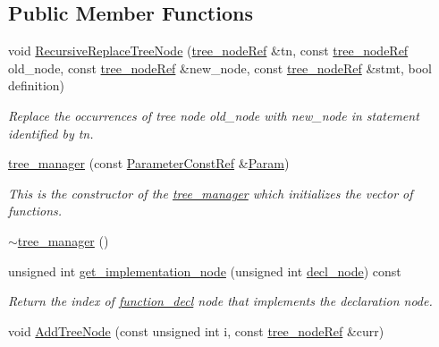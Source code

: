 \subsection*{Public Member Functions}
\begin{DoxyCompactItemize}
\item 
void \hyperlink{classtree__manager_a667fbe393ae2af64dab9240f92134c5b}{Recursive\+Replace\+Tree\+Node} (\hyperlink{tree__node_8hpp_a6ee377554d1c4871ad66a337eaa67fd5}{tree\+\_\+node\+Ref} \&tn, const \hyperlink{tree__node_8hpp_a6ee377554d1c4871ad66a337eaa67fd5}{tree\+\_\+node\+Ref} old\+\_\+node, const \hyperlink{tree__node_8hpp_a6ee377554d1c4871ad66a337eaa67fd5}{tree\+\_\+node\+Ref} \&new\+\_\+node, const \hyperlink{tree__node_8hpp_a6ee377554d1c4871ad66a337eaa67fd5}{tree\+\_\+node\+Ref} \&stmt, bool definition)
\begin{DoxyCompactList}\small\item\em Replace the occurrences of tree node old\+\_\+node with new\+\_\+node in statement identified by tn. \end{DoxyCompactList}\item 
\hyperlink{classtree__manager_ad534a11d39d51b9d41f35a6c40cafe13}{tree\+\_\+manager} (const \hyperlink{Parameter_8hpp_a37841774a6fcb479b597fdf8955eb4ea}{Parameter\+Const\+Ref} \&\hyperlink{classtree__manager_a34d676e5357b95584d95d20e229e6c0e}{Param})
\begin{DoxyCompactList}\small\item\em This is the constructor of the \hyperlink{classtree__manager}{tree\+\_\+manager} which initializes the vector of functions. \end{DoxyCompactList}\item 
\hyperlink{classtree__manager_aa1d84289bfb70f965da1a12446fd947f}{$\sim$tree\+\_\+manager} ()
\item 
unsigned int \hyperlink{classtree__manager_a5781a4878fd8df312cbff50cbd3837de}{get\+\_\+implementation\+\_\+node} (unsigned int \hyperlink{structdecl__node}{decl\+\_\+node}) const
\begin{DoxyCompactList}\small\item\em Return the index of \hyperlink{structfunction__decl}{function\+\_\+decl} node that implements the declaration node. \end{DoxyCompactList}\item 
void \hyperlink{classtree__manager_ad41741bfa4e46fa272d0e321eb722893}{Add\+Tree\+Node} (const unsigned int i, const \hyperlink{tree__node_8hpp_a6ee377554d1c4871ad66a337eaa67fd5}{tree\+\_\+node\+Ref} \&curr)

\end{DoxyCompactItemize}
